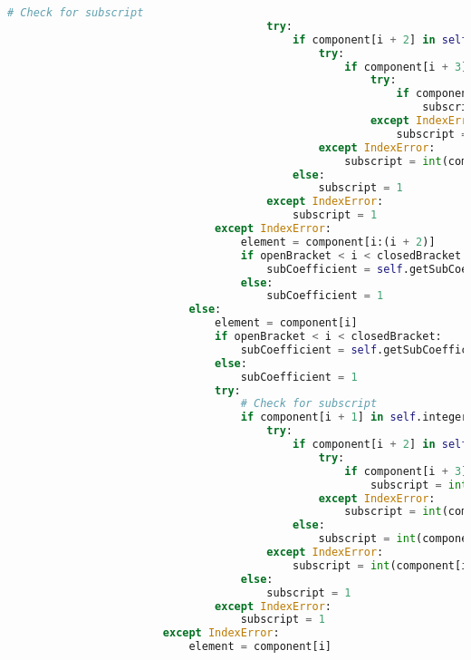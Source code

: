 \documentclass[a4paper,12pt]{article}
\begin{document}
\begin{lstlisting}[language=Python, caption=parseComponent method for finding elements, label={lst:parsecomponent}]
                                        # Check for subscript
                                        try:
                                            if component[i + 2] in self.integers:
                                                try:
                                                    if component[i + 3] in self.integers:
                                                        try:
                                                            if component[i + 4] in self.integers:
                                                                subscript = int(component[(i + 2): (i + 5)])
                                                        except IndexError:
                                                            subscript = int(component[(i + 2): (i + 4)])
                                                except IndexError:
                                                    subscript = int(component[i + 2])
                                            else:
                                                subscript = 1
                                        except IndexError:
                                            subscript = 1
                                except IndexError:
                                    element = component[i:(i + 2)]
                                    if openBracket < i < closedBracket:
                                        subCoefficient = self.getSubCoefficient(component)
                                    else:
                                        subCoefficient = 1
                            else:
                                element = component[i]
                                if openBracket < i < closedBracket:
                                    subCoefficient = self.getSubCoefficient(component)
                                else:
                                    subCoefficient = 1
                                try:
                                    # Check for subscript
                                    if component[i + 1] in self.integers:
                                        try:
                                            if component[i + 2] in self.integers:
                                                try:
                                                    if component[i + 3] in self.integers:
                                                        subscript = int(component[i + 1: i + 4])
                                                except IndexError:
                                                    subscript = int(component[i + 1: i + 3])
                                            else:
                                                subscript = int(component[i + 1])
                                        except IndexError:
                                            subscript = int(component[i + 1])
                                    else:
                                        subscript = 1
                                except IndexError:
                                    subscript = 1
                        except IndexError:
                            element = component[i]


\end{lstlisting}
\end{document}
